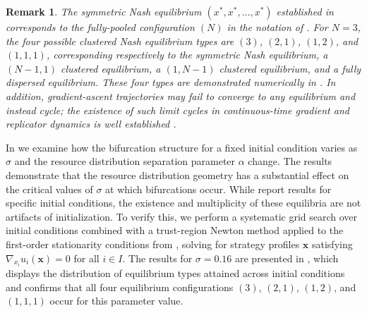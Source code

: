 \documentclass{article}
\newtheorem{remark}{Remark}
\begin{document}
            \begin{remark}
                The symmetric Nash equilibrium $(x^*, x^*, \ldots, x^*)$ established in  corresponds to the fully-pooled configuration $(N)$ in the notation of . For $N = 3$, the four possible clustered Nash equilibrium types are $(3)$, $(2,1)$, $(1,2)$, and $(1,1,1)$, corresponding respectively to the symmetric Nash equilibrium, a $(N-1,1)$ clustered equilibrium, a $(1,N-1)$ clustered equilibrium, and a fully dispersed equilibrium. These four types are demonstrated numerically in . In addition, gradient-ascent trajectories may fail to converge to any equilibrium and instead cycle; the existence of such limit cycles in continuous-time gradient and replicator dynamics is well established \cite{hofbauer2003evolutionary,sandholm2010population}.
            \end{remark}

            In  we examine how the bifurcation structure for a 
            fixed initial condition varies as $\sigma$ and the resource distribution separation parameter $\alpha$ change. The results demonstrate that the resource distribution geometry has a substantial effect on the critical values of $\sigma$ at which bifurcations occur. While  report results for specific initial conditions, the existence and multiplicity of these equilibria are not artifacts of initialization. To verify this, we perform a systematic grid search over initial conditions combined with a trust-region Newton method \cite{conn2000trust} applied to the first-order stationarity conditions from , solving for strategy profiles $\mathbf{x}$ satisfying $\nabla_{x_i} u_i(\mathbf{x}) = 0$ for all $i \in I$. The results for $\sigma = 0.16$ are presented in , which displays the distribution of equilibrium types attained across initial conditions and confirms that all four equilibrium configurations $(3)$, $(2,1)$, $(1,2)$, and $(1,1,1)$ occur for this parameter value.
 
\end{document}
